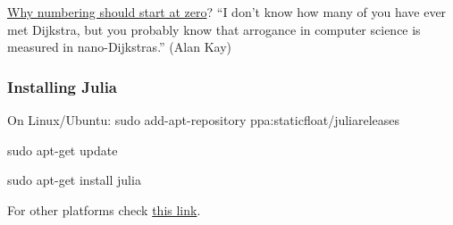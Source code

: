 \documentclass{beamer}
\begin{document}
\begin{frame}
  \href{https://www.cs.utexas.edu/users/EWD/transcriptions/EWD08xx/EWD831.html}{Why numbering should start at zero}?
  \pause
  ``I don't know how many of you have ever met Dijkstra, but you probably know that arrogance in computer science is measured in nano-Dijkstras.'' (Alan Kay)
\end{frame}

\begin{frame}
  \frametitle{Installing Julia}

  \begin{block}{On Linux/Ubuntu:}
  sudo add-apt-repository ppa:staticfloat/juliareleases

  sudo apt-get update

  sudo apt-get install julia  
  \end{block}
  \vspace{2cm}
  For other platforms check \href{http://julialang.org/downloads/platform.html}{this link}.
\end{frame}


\end{document}
